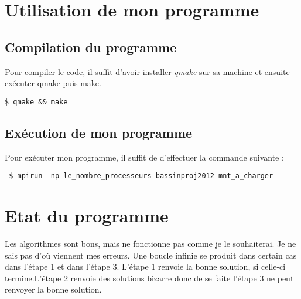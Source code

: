 \documentclass[12pt,a4paper,utf8x]{report}
\begin{document}
\begin{onehalfspace}
\begin{lstlisting}
\end{lstlisting}

\section{Utilisation de mon programme}

\subsection{Compilation du programme}

Pour compiler le code, il suffit d'avoir installer \emph{qmake} sur sa machine et ensuite exécuter qmake puis make.
\begin{verbatim}
$ qmake && make
\end{verbatim}

\subsection{Exécution de mon programme}
 Pour exécuter mon programme, il suffit de d'effectuer la commande suivante :
 \begin{verbatim}
 $ mpirun -np le_nombre_processeurs bassinproj2012 mnt_a_charger
 \end{verbatim}
\end{onehalfspace}

\section{Etat du programme}
	Les algorithmes sont bons, mais ne fonctionne pas comme je le souhaiterai. Je ne sais pas d’où viennent mes erreurs. Une boucle infinie se produit dans certain cas dans l'étape 1 et dans l'étape 3. L'étape 1 renvoie la bonne solution, si celle-ci termine.L'étape 2 renvoie des solutions bizarre donc de se faite l'étape 3 ne peut renvoyer la bonne solution.
\end{document}
